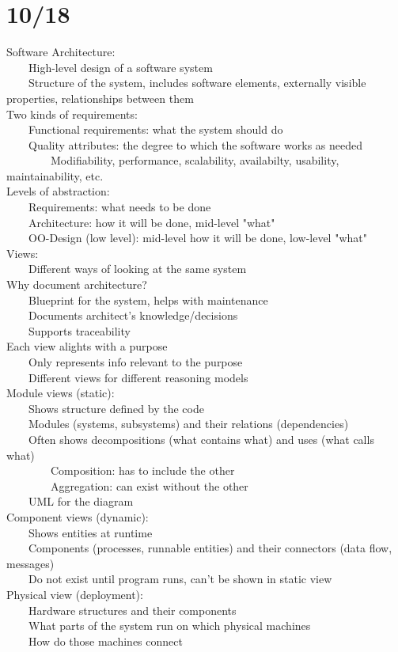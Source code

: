 \documentclass[10pt,letterpaper,unboxed,cm]{article}
\newcommand{\tab}{~~~~}
\begin{document}
\section{10/18}
Software Architecture:\\
\tab High-level design of a software system\\
\tab Structure of the system, includes software elements, externally visible properties, relationships between them\\
Two kinds of requirements: \\
\tab Functional requirements: what the system should do\\
\tab Quality attributes: the degree to which the software works as needed\\
\tab \tab Modifiability, performance, scalability, availabilty, usability, maintainability, etc.\\
Levels of abstraction: \\
\tab Requirements: what needs to be done\\
\tab Architecture: how it will be done, mid-level "what"\\
\tab OO-Design (low level): mid-level how it will be done, low-level "what"\\
Views: \\
\tab Different ways of looking at the same system\\
Why document architecture?\\
\tab Blueprint for the system, helps with maintenance\\
\tab Documents architect's knowledge/decisions\\
\tab Supports traceability\\
Each view alights with a purpose\\
\tab Only represents info relevant to the purpose\\
\tab Different views for different reasoning models\\
Module views (static): \\
\tab Shows structure defined by the code\\
\tab Modules (systems, subsystems) and their relations (dependencies)\\
\tab Often shows decompositions (what contains what) and uses (what calls what)\\
\tab \tab Composition: has to include the other\\
\tab \tab Aggregation: can exist without the other\\
\tab UML for the diagram\\
Component views (dynamic): \\
\tab Shows entities at runtime\\
\tab Components (processes, runnable entities) and their connectors (data flow, messages)\\
\tab Do not exist until program runs, can't be shown in static view\\
Physical view (deployment): \\
\tab Hardware structures and their components\\
\tab What parts of the system run on which physical machines\\
\tab How do those machines connect\\
\end{document}
